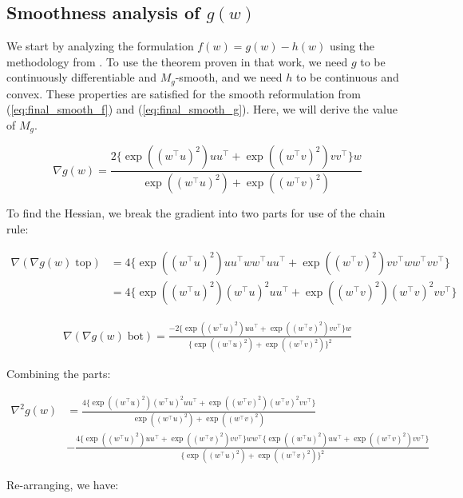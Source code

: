 \documentclass[11pt]{article}
\begin{document}
\subsection{Smoothness analysis of $g(w)$}

We start by analyzing the formulation $f(w) = g(w) - h(w)$ using the methodology from \cite{khamaru_convergence_2018}. To use the theorem proven in that work, we need $g$ to be continuously differentiable and $M_g$-smooth, and we need $h$ to be continuous and convex. These properties are satisfied for the smooth reformulation from (\ref{eq:final_smooth_f}) and (\ref{eq:final_smooth_g}). Here, we will derive the value of $M_g$.

\begin{equation}
    \nabla g(w) 
    = \frac{ 2 \{ \exp((w^{\top}u)^2)uu^{\top} + \exp((w^{\top}v)^2)vv^{\top}  \} w}{ \exp((w^{\top}u)^2) + \exp((w^{\top}v)^2) }
\end{equation}

To find the Hessian, we break the gradient into two parts for use of the chain rule:

\begin{align*}
    \nabla (\nabla g(w) \; \textrm{top}) 
    &= 4 \{ \exp((w^{\top}u)^2)uu^{\top}ww^{\top}uu^{\top} + \exp((w^{\top}v)^2)vv^{\top}ww^{\top}vv^{\top} \} \\
    &= 4 \{ \exp((w^{\top}u)^2)(w^{\top}u)^2 uu^{\top} + \exp((w^{\top}v)^2)(w^{\top}v)^2 vv^{\top} \}
\end{align*}

\begin{align*}
    \nabla (\nabla g(w) \; \textrm{bot}) = \frac{ -2 \{ \exp((w^{\top}u)^2)uu^{\top} + \exp((w^{\top}v)^2)vv^{\top} \} w }{ \{ \exp((w^{\top}u)^2) + \exp((w^{\top}v)^2) \}^2 }
\end{align*}

Combining the parts:

\begin{align*}
    \nabla^2 g(w) &= 
    \frac{ 4 \{ \exp((w^{\top}u)^2)(w^{\top}u)^2 uu^{\top} + \exp((w^{\top}v)^2)(w^{\top}v)^2 vv^{\top} \} }{ \exp((w^{\top}u)^2) + \exp((w^{\top}v)^2)  } \\
    &- \frac{ 4 \{ \exp((w^{\top}u)^2)uu^{\top} + \exp((w^{\top}v)^2)vv^{\top}  \} ww^{\top} \{ \exp((w^{\top}u)^2)uu^{\top} + \exp((w^{\top}v)^2)vv^{\top}  \} }{ \{ \exp((w^{\top}u)^2) + \exp((w^{\top}v)^2) \}^2 }
\end{align*}

Re-arranging, we have:
\end{document}
